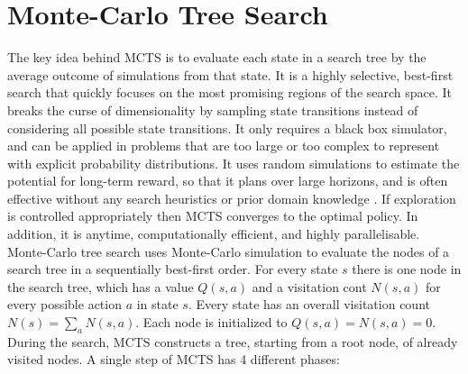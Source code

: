 \documentclass[a4paper,10pt]{article}
\begin{document}
\section{Monte-Carlo Tree Search}
The key idea behind MCTS is to evaluate each state in a search tree by the average outcome of simulations from that state. It is a highly selective, best-first search that quickly focuses on the most promising regions of the search space. It breaks the curse of dimensionality by sampling state transitions instead of considering all possible state transitions. It only requires a black box simulator, and can be applied in problems that are too large or too complex to represent with explicit probability distributions. It uses random simulations to estimate the potential for long-term reward, so that it plans over large horizons, and is often effective without any search heuristics or prior domain knowledge \cite{kocsis2006}. If exploration is controlled appropriately then MCTS converges to the optimal policy. In addition, it is anytime, computationally efficient, and highly parallelisable.\\
Monte-Carlo tree search uses Monte-Carlo simulation to evaluate the nodes of a search tree in a sequentially best-first order. For every state $s$ there is one node in the search tree, which has a value $Q(s, a)$ and a visitation cont $N(s, a)$ for every possible action $a$ in state $s$. Every state has an overall visitation count $N(s) = \sum_{a} N(s, a)$. Each node is initialized to $Q(s, a) = N(s, a) = 0$.\\
During the search, MCTS constructs a tree, starting from a root node, of already visited nodes. A single step of MCTS has 4 different phases:
\end{document}
